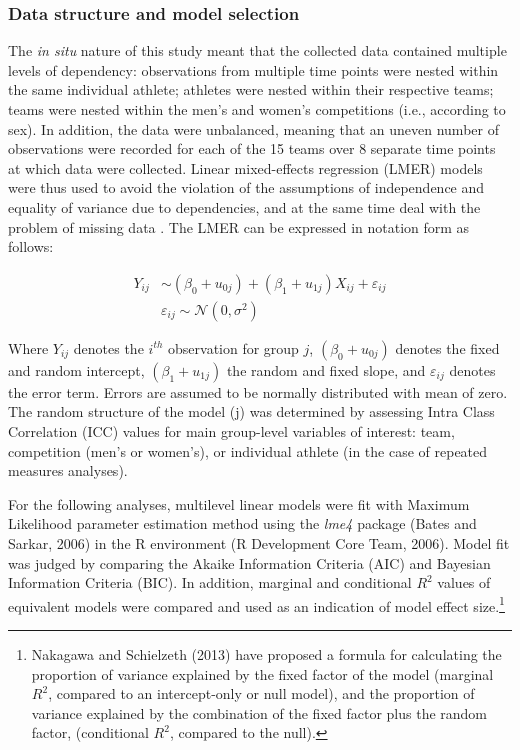\begin{CJK}{UTF8}{gbsn}
\subsubsection{Data structure and model selection\label{sect:dataStructureModelSelection}}
The \textit{in situ} nature of this study meant that the collected data contained multiple levels of dependency: observations from multiple time points were nested within the same individual athlete; athletes were nested within their respective teams; teams were nested within the men's and women's competitions (i.e., according to sex).  In addition, the data were unbalanced, meaning that an uneven number of observations were recorded for each of the 15 teams over 8 separate time points at which data were collected.  Linear mixed-effects regression (LMER) models were thus used to avoid the violation of the assumptions of independence and equality of variance due to dependencies, and at the same time deal with the problem of missing data \citep{Quene2004,Field2012}.  The LMER can be expressed in notation form as follows:

    \begin{align}
      Y_{ij} & \sim  (\beta_{0} + u_{0j}) + (\beta_{1} + u_{1j})X_{ij} + \varepsilon_{ij}\\
           & \varepsilon_{ij} \sim \mathcal{N}(0,\sigma^{2})
    \end{align}

Where $Y_{ij}$ denotes the $i^{th}$ observation for group $j$, $(\beta_{0} + u_{0j})$ denotes the fixed and random intercept, $(\beta_{1} + u_{1j})$ the random and fixed slope, and $\varepsilon_{ij}$ denotes the error term.  Errors are assumed to be normally distributed with mean of zero.
The random structure of the model (j) was determined by assessing Intra Class Correlation (ICC) values for main group-level variables of interest: team, competition (men's or women's), or individual athlete (in the case of repeated measures analyses).

For the following analyses, multilevel linear models were fit with Maximum Likelihood parameter estimation method using the \textit{lme4} package (Bates and Sarkar, 2006) in the R environment (R Development Core Team, 2006). Model fit was judged by comparing the Akaike Information Criteria (AIC) and Bayesian Information Criteria (BIC).  In addition, marginal and conditional $R^2$ values of equivalent models were compared and used as an indication of model effect size.\footnote{Nakagawa and Schielzeth (2013) have proposed a formula for calculating the proportion of variance explained by the fixed factor of the model (marginal $R^2$, compared to an intercept-only or null model), and the proportion of variance explained by the combination of the fixed factor plus the random factor, (conditional $R^2$, compared to the null).}


\end{CJK}
